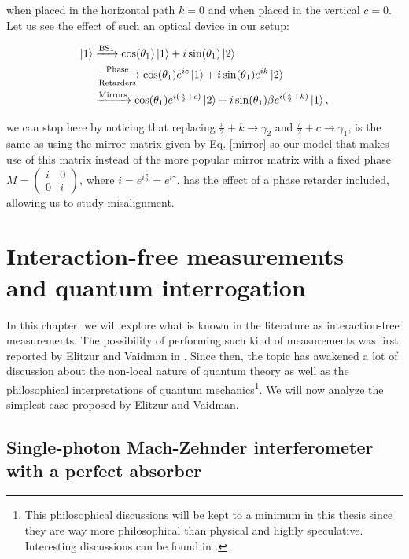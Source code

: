 \documentclass[12pt]{book}
\newcommand\blankpage{
    \null
    \thispagestyle{empty}
    \addtocounter{page}{0}
    \newpage
    }
\begin{document}
when placed in the horizontal path $k=0$ and when placed in the vertical $c=0$. Let us see the effect of such an optical device in our setup:

\begin{align*}
\ket{1}&\xrightarrow{\text{BS1}}\cos(\theta_{1})\ket{1}+i\sin(\theta_{1})\ket{2}\\ &\xrightarrow[\text{Retarders}]{\text{Phase}}\cos(\theta_{1})e^{ic}\ket{1}+i\sin(\theta_{1}) e^{ik}\ket{2} \\ &\xrightarrow{\text{Mirrors}} \cos(\theta_{1})e^{i(\frac{\pi}{2}+c)}\ket{2}+i\sin(\theta_{1})\beta e^{i(\frac{\pi}{2}+k)}\ket{1},
\end{align*}

we can stop here by noticing that replacing $\frac{\pi}{2}+k\xrightarrow{}\gamma_{2}$ and  $\frac{\pi}{2}+c\xrightarrow{}\gamma_{1}$,  is the same as using the mirror matrix given by Eq. \ref{mirror} so our model that makes use of this matrix  instead of the more popular mirror matrix with a fixed phase $M=\begin{pmatrix} i & 0\\0& i\end{pmatrix}$, where $i=e^{i \frac{\pi}{2}}=e^{i\gamma}$, has the  effect of a phase retarder included, allowing us to study misalignment. 

\afterpage{\blankpage}

\chapter{ Interaction-free  measurements \\ and quantum interrogation}


In this chapter, we will explore what is known in the literature as interaction-free measurements. The possibility of performing such kind of measurements was first reported by Elitzur and Vaidman in \cite{Elitzur}. Since then, the topic has awakened a lot of discussion about the non-local nature of quantum theory as well as the philosophical interpretations of quantum mechanics\footnote{ This philosophical discussions will be kept to a minimum in this thesis since they are way more philosophical than physical and highly speculative. Interesting discussions can be found in \cite{paper_vaidman, maudlin}. }. We will now analyze the simplest case proposed by Elitzur and Vaidman.

\section[Elitzur-Vaidman's bomb detector]{Single-photon Mach-Zehnder interferometer with a perfect absorber}
\end{document}
